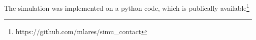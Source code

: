 \documentclass[crop]{CSLB}%
\begin{document}
The simulation was implemented on a python code, which is publically
available\footnote{https://github.com/mlares/simu\_contact}


%
%
%
%
%
%


                   
  
                
\end{document}
